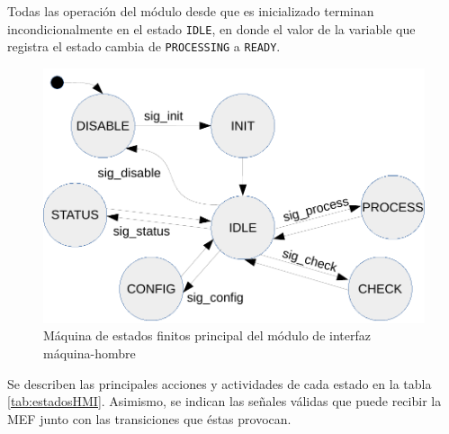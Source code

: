 Todas las operación del módulo desde que es inicializado terminan incondicionalmente en el estado \texttt{IDLE}, en donde el valor de la variable que registra el estado cambia de \texttt{PROCESSING} a \texttt{READY}.

\begin{figure}[htpb]
	\centering
	\includegraphics[width=\textwidth]{./Figures/MEF_HMI_2.pdf}
	\caption[MEF principal del módulo de HMI]{Máquina de estados finitos principal del módulo de interfaz máquina-hombre}
	\label{fig:mef_HMI}
\end{figure}

Se describen las principales acciones y actividades de cada estado en la tabla \ref{tab:estadosHMI}.  Asimismo, se indican las señales válidas que puede recibir la MEF junto con las transiciones que éstas provocan.


